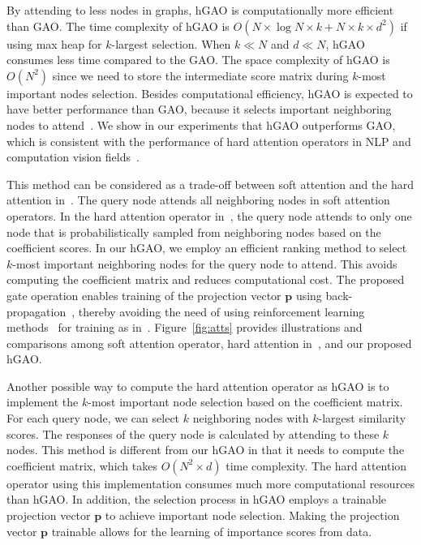 \documentclass[sigconf]{acmart}
\begin{document}
By attending to less nodes in graphs, hGAO is computationally more
efficient than GAO. The time complexity of hGAO is $O(N \times \log
N \times k + N \times k \times d^2)$ if using max heap for
$k$-largest selection. When $k \ll N$ and $d \ll N$, hGAO consumes
less time compared to the GAO. The space complexity of hGAO is
$O(N^2)$ since we need to store the intermediate score matrix during
$k$-most important nodes selection. Besides computational
efficiency, hGAO is expected to have better performance than GAO,
because it selects important neighboring nodes to
attend~\cite{malinowski2018learning}. We show in our experiments
that hGAO outperforms GAO, which is consistent with the performance
of hard attention operators in NLP and computation vision
fields~\cite{xu2015show,luong2015effective}.


This method can be considered as a trade-off between soft attention
and the hard attention in~\cite{xu2015show}. The query node attends
all neighboring nodes in soft attention operators. In the hard
attention operator in~\cite{xu2015show}, the query node attends to
only one node that is probabilistically sampled from neighboring
nodes based on the coefficient scores. In our hGAO, we employ an
efficient ranking method to select $k$-most important neighboring
nodes for the query node to attend. This avoids computing the
coefficient matrix and reduces computational cost. The proposed gate
operation enables training of the projection vector $\boldsymbol p$
using back-propagation~\cite{lecun2012efficient}, thereby avoiding
the need of using reinforcement learning
methods~\cite{rao2017attention} for training as
in~\cite{xu2015show}. Figure~\ref{fig:atts} provides illustrations
and comparisons among soft attention operator, hard attention
in~\cite{xu2015show}, and our proposed hGAO.

Another possible way to compute the hard attention operator as hGAO
is to implement the $k$-most important node selection based on the
coefficient matrix. For each query node, we can select $k$
neighboring nodes with $k$-largest similarity scores. The responses
of the query node is calculated by attending to these $k$ nodes.
This method is different from our hGAO in that it needs to compute
the coefficient matrix, which takes $O(N^2 \times d)$ time
complexity. The hard attention operator using this implementation
consumes much more computational resources than hGAO. In addition,
the selection process in hGAO employs a trainable projection vector
$\boldsymbol p$ to achieve important node selection. Making the
projection vector $\boldsymbol p$ trainable allows for the learning
of importance scores from data.
\end{document}
